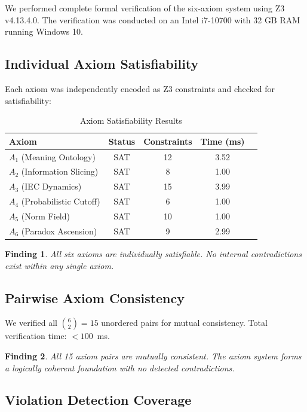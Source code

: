 \documentclass[11pt,a4paper]{article}
\newtheorem*{finding}{Finding}
\begin{document}
We performed complete formal verification of the six-axiom system using Z3 v4.13.4.0. The verification was conducted on an Intel i7-10700 with 32 GB RAM running Windows 10.

\subsection{Individual Axiom Satisfiability}

Each axiom was independently encoded as Z3 constraints and checked for satisfiability:

\begin{table}[h]
\centering
\caption{Axiom Satisfiability Results}
\label{tab:axiom_sat}
\begin{tabular}{@{}lcccc@{}}
\toprule
\textbf{Axiom} & \textbf{Status} & \textbf{Constraints} & \textbf{Time (ms)} \\
\midrule
$A_1$ (Meaning Ontology)  & SAT & 12 & 3.52 \\
$A_2$ (Information Slicing) & SAT &  8 & 1.00 \\
$A_3$ (IEC Dynamics)      & SAT & 15 & 3.99 \\
$A_4$ (Probabilistic Cutoff) & SAT &  6  & 1.00 \\
$A_5$ (Norm Field)        & SAT & 10 & 1.00 \\
$A_6$ (Paradox Ascension)  & SAT &  9 & 2.99 \\
\bottomrule
\end{tabular}
\end{table}

\begin{finding}
All six axioms are individually satisfiable. No internal contradictions exist within any single axiom.
\end{finding}

\subsection{Pairwise Axiom Consistency}

We verified all $\binom{6}{2}=15$ unordered pairs for mutual consistency. Total verification time: $<100$~ms.

\begin{finding}
All 15 axiom pairs are mutually consistent. The axiom system forms a logically coherent foundation with no detected contradictions.
\end{finding}

\subsection{Violation Detection Coverage}
\end{document}
